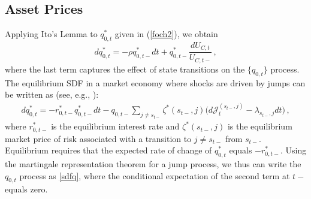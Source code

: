 \documentclass[12pt]{article}
\newcommand{\NW}[1]{{\textcolor{blue}{#1}}}
\begin{document}
\subsection{Asset Prices} 
%
Applying Ito's Lemma to $q_{0,t}^*$  given in (\ref{foch2}), we obtain 
\begin{equation} \label{dq} 
d q_{0, t}^* = - \rho q_{0, t-}^* d t + q_{0, t-}^* \frac{dU_{C, t}}{U_{C, t-}} \,,  %
\end{equation}
where the last term captures the effect of state transitions on the $\{q_{0, t}\}$ process.  
The equilibrium SDF in a market economy where shocks are driven by jumps can be written  as  (see, e.g., \cite{duffie2010dynamic}): %
\begin{eqnarray}\label{sdfq}
d q_{0, t}^* = - r^{*}_{0, t-} q_{0, t-}^*dt  -  q_{0, t-}  \sum_{j\neq s_{t-}} \zeta^*(s_{t-}, j)\big(d {\mathcal J}_t^{(s_{t-}, j)} - \lambda_{s_{t-}, j} d t \big)\,,
\end{eqnarray}
where $r^{*}_{0, t-}$ is the equilibrium interest rate  and  $\zeta^*(s_{t-}, j)  $ is the equilibrium market price of risk associated with a transition to $j\neq s_{t-}$ from $s_{t-}$.  Equilibrium requires that the expected rate of  change of $q_{0,t}^\ast$ equals  
$-r_{0,t-}^\ast$. Using the martingale representation theorem for a jump process, we thus can write the $q_{0, t}$ process as \eqref{sdfq}, where the conditional expectation of the second term at $t-$ equals zero.  %
\end{document}
